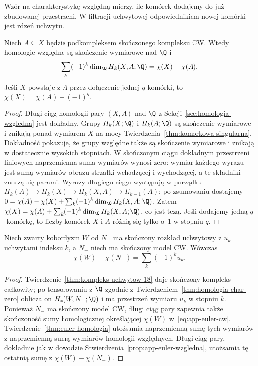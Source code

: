 Wzór na charakterystykę względną mierzy, ile komórek dodajemy do
już zbudowanej przestrzeni. W filtracji uchwytowej odpowiednikiem
nowej komórki jest rdzeń uchwytu.

\begin{stwierdzenie}
\label{prop:app-euler-wzgledna}
Niech $A\subseteq X$ będzie podkompleksem skończonego kompleksu CW.
Wtedy homologie względne są skończenie wymiarowe nad $\Q$ i
\begin{equation}\label{eq:app-euler-wzgledna}
 \sum_k(-1)^k\dim_{\Q}H_k(X,A;\Q)
 =\chi(X)-\chi(A).
\end{equation}
Jeśli $X$ powstaje z $A$ przez dołączenie jednej $q$-komórki,
to $\chi(X)=\chi(A)+(-1)^q$.
\end{stwierdzenie}
\begin{proof}
Długi ciąg homologii pary $(X,A)$ nad $\Q$ z
Sekcji~\ref{sec:homologia-wzgledna} jest dokładny.
Grupy $H_k(X;\Q)$ i $H_k(A;\Q)$ są skończenie wymiarowe i znikają
ponad wymiarem $X$ na mocy Twierdzenia~\ref{thm:komorkowa-singularna}.
Dokładność pokazuje, że grupy względne także są skończenie
wymiarowe i znikają w dostatecznie wysokich stopniach.
W skończonym ciągu dokładnym przestrzeni liniowych naprzemienna suma
wymiarów wynosi zero: wymiar każdego wyrazu jest sumą wymiarów
obrazu strzałki wchodzącej i wychodzącej, a te składniki znoszą się
parami. Wyrazy długiego ciągu występują w porządku
$H_k(A)\to H_k(X)\to H_k(X,A)\to H_{k-1}(A)$;
po zsumowaniu dostajemy
$0=\chi(A)-\chi(X)+\sum_k(-1)^k\dim_{\Q}H_k(X,A;\Q)$.
Zatem
$\chi(X)=\chi(A)+\sum_k(-1)^k\dim_{\Q}H_k(X,A;\Q)$,
co jest tezą. Jeśli dodajemy jedną $q$-komórkę, to liczby komórek
$X$ i $A$ różnią się tylko o~$1$ w stopniu $q$.
\end{proof}

\begin{wniosek}
\label{cor:app-euler-uchwyty}
Niech zwarty kobordyzm $W$ od $N_-$ ma skończony rozkład uchwytowy
z $u_k$ uchwytami indeksu $k$, a $N_-$ niech ma skończony model CW.
Wówczas
\[
 \chi(W)-\chi(N_-)=\sum_k(-1)^k u_k.
\]
\end{wniosek}
\begin{proof}
Twierdzenie~\ref{thm:kompleks-uchwytow-18} daje skończony kompleks
całkowity; po tensorowaniu z $\Q$ zgodnie z
Twierdzeniem~\ref{thm:homologia-char-zero} oblicza on
$H_*(W,N_-;\Q)$ i ma przestrzeń wymiaru $u_k$ w stopniu $k$.
Ponieważ $N_-$ ma skończony model CW,
długi ciąg pary zapewnia także skończoność sumy homologicznej
określającej $\chi(W)$ w~\eqref{eq:app-euler-cw}.
Twierdzenie~\ref{thm:euler-homologia}
utożsamia naprzemienną sumę tych wymiarów z naprzemienną sumą
wymiarów homologii względnych. Długi ciąg pary, dokładnie jak
w dowodzie Stwierdzenia~\ref{prop:app-euler-wzgledna}, utożsamia
tę ostatnią sumę z $\chi(W)-\chi(N_-)$.
\end{proof}

